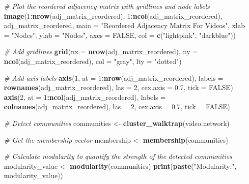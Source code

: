 \documentclass[
]{article}
\newenvironment{Shaded}{\begin{snugshade}}{\end{snugshade}}
\newcommand{\AttributeTok}[1]{\textcolor[rgb]{0.13,0.29,0.53}{#1}}
\newcommand{\CommentTok}[1]{\textcolor[rgb]{0.56,0.35,0.01}{\textit{#1}}}
\newcommand{\ConstantTok}[1]{\textcolor[rgb]{0.56,0.35,0.01}{#1}}
\newcommand{\DecValTok}[1]{\textcolor[rgb]{0.00,0.00,0.81}{#1}}
\newcommand{\FloatTok}[1]{\textcolor[rgb]{0.00,0.00,0.81}{#1}}
\newcommand{\FunctionTok}[1]{\textcolor[rgb]{0.13,0.29,0.53}{\textbf{#1}}}
\newcommand{\NormalTok}[1]{#1}
\newcommand{\OtherTok}[1]{\textcolor[rgb]{0.56,0.35,0.01}{#1}}
\newcommand{\SpecialCharTok}[1]{\textcolor[rgb]{0.81,0.36,0.00}{\textbf{#1}}}
\newcommand{\StringTok}[1]{\textcolor[rgb]{0.31,0.60,0.02}{#1}}
\begin{document}
\begin{Shaded}
\begin{Highlighting}[]
\CommentTok{\# Plot the reordered adjacency matrix with gridlines and node labels}
\FunctionTok{image}\NormalTok{(}\DecValTok{1}\SpecialCharTok{:}\FunctionTok{nrow}\NormalTok{(adj\_matrix\_reordered), }\DecValTok{1}\SpecialCharTok{:}\FunctionTok{ncol}\NormalTok{(adj\_matrix\_reordered), adj\_matrix\_reordered, }
      \AttributeTok{main =} \StringTok{"Reordered Adjacency Matrix For Videos"}\NormalTok{, }
      \AttributeTok{xlab =} \StringTok{"Nodes"}\NormalTok{, }\AttributeTok{ylab =} \StringTok{"Nodes"}\NormalTok{, }
      \AttributeTok{axes =} \ConstantTok{FALSE}\NormalTok{, }\AttributeTok{col =} \FunctionTok{c}\NormalTok{(}\StringTok{"lightpink"}\NormalTok{, }\StringTok{"darkblue"}\NormalTok{))}

\CommentTok{\# Add gridlines}
\FunctionTok{grid}\NormalTok{(}\AttributeTok{nx =} \FunctionTok{nrow}\NormalTok{(adj\_matrix\_reordered), }\AttributeTok{ny =} \FunctionTok{ncol}\NormalTok{(adj\_matrix\_reordered), }\AttributeTok{col =} \StringTok{"gray"}\NormalTok{, }\AttributeTok{lty =} \StringTok{"dotted"}\NormalTok{)}

\CommentTok{\# Add axis labels}
\FunctionTok{axis}\NormalTok{(}\DecValTok{1}\NormalTok{, }\AttributeTok{at =} \DecValTok{1}\SpecialCharTok{:}\FunctionTok{nrow}\NormalTok{(adj\_matrix\_reordered), }\AttributeTok{labels =} \FunctionTok{rownames}\NormalTok{(adj\_matrix\_reordered), }\AttributeTok{las =} \DecValTok{2}\NormalTok{, }\AttributeTok{cex.axis =} \FloatTok{0.7}\NormalTok{, }\AttributeTok{tick =} \ConstantTok{FALSE}\NormalTok{)}
\FunctionTok{axis}\NormalTok{(}\DecValTok{2}\NormalTok{, }\AttributeTok{at =} \DecValTok{1}\SpecialCharTok{:}\FunctionTok{ncol}\NormalTok{(adj\_matrix\_reordered), }\AttributeTok{labels =} \FunctionTok{colnames}\NormalTok{(adj\_matrix\_reordered), }\AttributeTok{las =} \DecValTok{2}\NormalTok{, }\AttributeTok{cex.axis =} \FloatTok{0.7}\NormalTok{, }\AttributeTok{tick =} \ConstantTok{FALSE}\NormalTok{)}

\CommentTok{\# Detect communities}
\NormalTok{communities }\OtherTok{\textless{}{-}} \FunctionTok{cluster\_walktrap}\NormalTok{(video.network)}

\CommentTok{\# Get the membership vector}
\NormalTok{membership }\OtherTok{\textless{}{-}} \FunctionTok{membership}\NormalTok{(communities)}

\CommentTok{\# Calculate modularity to quantify the strength of the detected communities}
\NormalTok{modularity\_value }\OtherTok{\textless{}{-}} \FunctionTok{modularity}\NormalTok{(communities)}
\FunctionTok{print}\NormalTok{(}\FunctionTok{paste}\NormalTok{(}\StringTok{"Modularity:"}\NormalTok{, modularity\_value))}


\end{Highlighting}
\end{Shaded}
\end{document}
